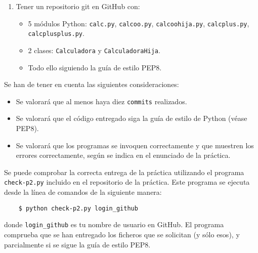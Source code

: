 \documentclass[11pt,a4paper]{article}
\begin{document}
\begin{enumerate}
  \item Tener un repositorio git en GitHub con:
  \begin{itemize}
      \item 5 módulos Python: \texttt{calc.py}, \texttt{calcoo.py}, \texttt{calcoohija.py}, \texttt{calcplus.py}, \texttt{calcplusplus.py}.
      \item 2 clases: \texttt{Calculadora} y \texttt{CalculadoraHija}.
      \item Todo ello siguiendo la guía de estilo PEP8.
  \end{itemize}
\end{enumerate}


Se han de tener en cuenta las siguientes consideraciones:
\begin{itemize}
  \item Se valorará que al menos haya diez \texttt{commits} realizados.
  \item Se valorará que el código entregado siga la guía de estilo de Python (véase PEP8).
  \item Se valorará que los programas se invoquen correctamente y que muestren los errores correctamente, según se indica en el enunciado de la práctica.
\end{itemize}

Se puede comprobar la correcta entrega de la práctica utilizando el programa \texttt{check-p2.py} incluido en el repositorio de la práctica. Este programa se ejecuta desde la línea de comandos de la siguiente manera:
\begin{verbatim}
	$ python check-p2.py login_github
\end{verbatim}

donde \texttt{login\_github} es tu nombre de usuario en GitHub. El programa comprueba que se han entregado los ficheros que se solicitan (y sólo esos), y parcialmente si se sigue la guía de estilo PEP8.
\end{document}
